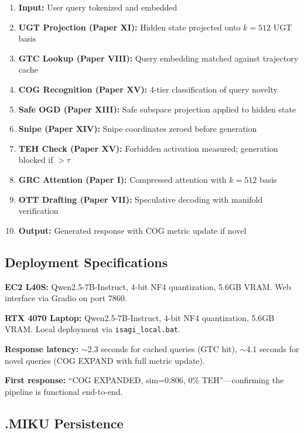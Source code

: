 \documentclass[11pt,a4paper]{article}
\begin{document}
\begin{enumerate}[nosep]
\item \textbf{Input:} User query tokenized and embedded
\item \textbf{UGT Projection (Paper XI):} Hidden state projected onto $k=512$ UGT basis
\item \textbf{GTC Lookup (Paper VIII):} Query embedding matched against trajectory cache
\item \textbf{COG Recognition (Paper XV):} 4-tier classification of query novelty
\item \textbf{Safe OGD (Paper XIII):} Safe subspace projection applied to hidden state
\item \textbf{Snipe (Paper XIV):} Snipe coordinates zeroed before generation
\item \textbf{TEH Check (Paper XV):} Forbidden activation measured; generation blocked if $> \tau$
\item \textbf{GRC Attention (Paper I):} Compressed attention with $k=512$ basis
\item \textbf{OTT Drafting (Paper VII):} Speculative decoding with manifold verification
\item \textbf{Output:} Generated response with COG metric update if novel
\end{enumerate}

\subsection{Deployment Specifications}

\textbf{EC2 L40S:} Qwen2.5-7B-Instruct, 4-bit NF4 quantization, 5.6GB VRAM. Web interface via Gradio on port 7860.

\textbf{RTX 4070 Laptop:} Qwen2.5-7B-Instruct, 4-bit NF4 quantization, 5.6GB VRAM. Local deployment via \texttt{isagi\_local.bat}.

\textbf{Response latency:} $\sim$2.3 seconds for cached queries (GTC hit), $\sim$4.1 seconds for novel queries (COG EXPAND with full metric update).

\textbf{First response:} ``COG EXPANDED, sim=0.806, 0\% TEH''---confirming the pipeline is functional end-to-end.

\subsection{.MIKU Persistence}
\end{document}
